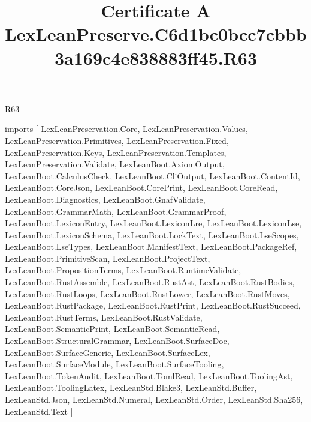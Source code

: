 \begin{lexlean}{R63}
\title{Certificate A LexLeanPreserve.C6d1bc0bcc7cbbb3a169c4e838883ff45.R63}
\begin{coremodule}
imports [
  LexLeanPreservation.Core,
  LexLeanPreservation.Values,
  LexLeanPreservation.Primitives,
  LexLeanPreservation.Fixed,
  LexLeanPreservation.Keys,
  LexLeanPreservation.Templates,
  LexLeanPreservation.Validate,
  LexLeanBoot.AxiomOutput,
  LexLeanBoot.CalculusCheck,
  LexLeanBoot.CliOutput,
  LexLeanBoot.ContentId,
  LexLeanBoot.CoreJson,
  LexLeanBoot.CorePrint,
  LexLeanBoot.CoreRead,
  LexLeanBoot.Diagnostics,
  LexLeanBoot.GnafValidate,
  LexLeanBoot.GrammarMath,
  LexLeanBoot.GrammarProof,
  LexLeanBoot.LexiconEntry,
  LexLeanBoot.LexiconLre,
  LexLeanBoot.LexiconLse,
  LexLeanBoot.LexiconSchema,
  LexLeanBoot.LockText,
  LexLeanBoot.LseScopes,
  LexLeanBoot.LseTypes,
  LexLeanBoot.ManifestText,
  LexLeanBoot.PackageRef,
  LexLeanBoot.PrimitiveScan,
  LexLeanBoot.ProjectText,
  LexLeanBoot.PropositionTerms,
  LexLeanBoot.RuntimeValidate,
  LexLeanBoot.RustAssemble,
  LexLeanBoot.RustAst,
  LexLeanBoot.RustBodies,
  LexLeanBoot.RustLoops,
  LexLeanBoot.RustLower,
  LexLeanBoot.RustMoves,
  LexLeanBoot.RustPackage,
  LexLeanBoot.RustPrint,
  LexLeanBoot.RustSucceed,
  LexLeanBoot.RustTerms,
  LexLeanBoot.RustValidate,
  LexLeanBoot.SemanticPrint,
  LexLeanBoot.SemanticRead,
  LexLeanBoot.StructuralGrammar,
  LexLeanBoot.SurfaceDoc,
  LexLeanBoot.SurfaceGeneric,
  LexLeanBoot.SurfaceLex,
  LexLeanBoot.SurfaceModule,
  LexLeanBoot.SurfaceTooling,
  LexLeanBoot.TokenAudit,
  LexLeanBoot.TomlRead,
  LexLeanBoot.ToolingAst,
  LexLeanBoot.ToolingLatex,
  LexLeanStd.Blake3,
  LexLeanStd.Buffer,
  LexLeanStd.Json,
  LexLeanStd.Numeral,
  LexLeanStd.Order,
  LexLeanStd.Sha256,
  LexLeanStd.Text
]


\end{coremodule}
\end{lexlean}
